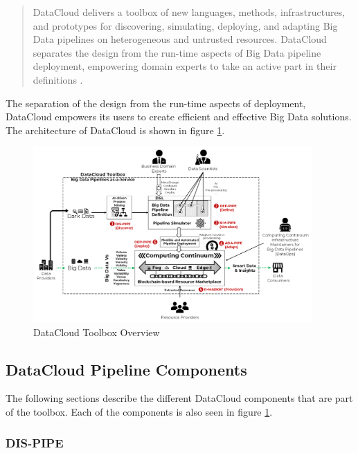 \documentclass{article}
\begin{document}
        \begin{quote}
            DataCloud delivers a toolbox of new languages, methods, infrastructures, and prototypes for discovering, simulating, deploying, and adapting Big Data pipelines on heterogeneous and untrusted resources. DataCloud separates the design from the run-time aspects of Big Data pipeline deployment, empowering domain experts to take an active part in their definitions \cite{dumitruProjectProjectDataCloud}.
        \end{quote}
        The separation of the design from the run-time aspects of deployment, DataCloud empowers its users to create efficient and effective Big Data solutions.
        The architecture of DataCloud is shown in figure \ref{fig:datacloud-toolbox-overview}.

        \begin{figure}[h!]
            \centering
            \includegraphics[width=0.95\textwidth]{figures/datacloud_toolbox.png}
            \caption{DataCloud Toolbox Overview \cite{dumitruDataCloudToolbox}}
            \label{fig:datacloud-toolbox-overview}
        \end{figure}


        \subsection{DataCloud Pipeline Components}
        \label{sec:architecture-datacloud}

            The following sections describe the different DataCloud components that are part of the toolbox.
            Each of the components is also seen in figure \ref{fig:datacloud-toolbox-overview}.
            
            \subsubsection*{DIS-PIPE}
            \label{sec:discover-pipe-datacloud}
\end{document}
